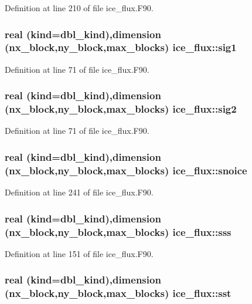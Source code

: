 Definition at line 210 of file ice\_\-flux.F90.\hypertarget{namespaceice__flux_a4e0e291e34267f30266f8a41db36affb}{
\subsubsection[{sig1}]{\setlength{\rightskip}{0pt plus 5cm}real (kind=dbl\_\-kind),dimension (nx\_\-block,ny\_\-block,max\_\-blocks) {\bf ice\_\-flux::sig1}}}
\label{namespaceice__flux_a4e0e291e34267f30266f8a41db36affb}


Definition at line 71 of file ice\_\-flux.F90.\hypertarget{namespaceice__flux_a7bf5a07a0946af77cd35135d6ce11771}{
\subsubsection[{sig2}]{\setlength{\rightskip}{0pt plus 5cm}real (kind=dbl\_\-kind),dimension (nx\_\-block,ny\_\-block,max\_\-blocks) {\bf ice\_\-flux::sig2}}}
\label{namespaceice__flux_a7bf5a07a0946af77cd35135d6ce11771}


Definition at line 71 of file ice\_\-flux.F90.\hypertarget{namespaceice__flux_a081cc6f264496624fb6bce9e69e74d9c}{
\subsubsection[{snoice}]{\setlength{\rightskip}{0pt plus 5cm}real (kind=dbl\_\-kind),dimension (nx\_\-block,ny\_\-block,max\_\-blocks) {\bf ice\_\-flux::snoice}}}
\label{namespaceice__flux_a081cc6f264496624fb6bce9e69e74d9c}


Definition at line 241 of file ice\_\-flux.F90.\hypertarget{namespaceice__flux_a0549ab71dd5d6a3d23fc54b03daa9aba}{
\subsubsection[{sss}]{\setlength{\rightskip}{0pt plus 5cm}real (kind=dbl\_\-kind),dimension (nx\_\-block,ny\_\-block,max\_\-blocks) {\bf ice\_\-flux::sss}}}
\label{namespaceice__flux_a0549ab71dd5d6a3d23fc54b03daa9aba}


Definition at line 151 of file ice\_\-flux.F90.\hypertarget{namespaceice__flux_a760acd33d8c9c15ba312e94fc8b6cdec}{
\subsubsection[{sst}]{\setlength{\rightskip}{0pt plus 5cm}real (kind=dbl\_\-kind),dimension (nx\_\-block,ny\_\-block,max\_\-blocks) {\bf ice\_\-flux::sst}}}
\label{namespaceice__flux_a760acd33d8c9c15ba312e94fc8b6cdec}


